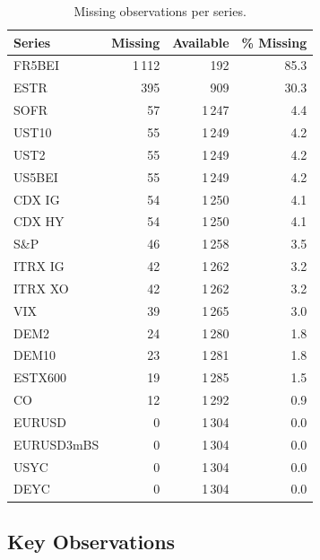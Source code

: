 \begin{table}[H]
  \centering
  \caption{Missing observations per series.}
  \label{tab:missing}
  \small
  \begin{tabular}{lrrr}
    \toprule
    \textbf{Series} & \textbf{Missing} & \textbf{Available} & \textbf{\% Missing} \\
    \midrule
    FR5BEI       & 1\,112 &   192 & 85.3 \\
    ESTR         &   395 &   909 & 30.3 \\
    SOFR         &    57 & 1\,247 &  4.4 \\
    UST10        &    55 & 1\,249 &  4.2 \\
    UST2         &    55 & 1\,249 &  4.2 \\
    US5BEI       &    55 & 1\,249 &  4.2 \\
    CDX IG       &    54 & 1\,250 &  4.1 \\
    CDX HY       &    54 & 1\,250 &  4.1 \\
    S\&P         &    46 & 1\,258 &  3.5 \\
    ITRX IG      &    42 & 1\,262 &  3.2 \\
    ITRX XO      &    42 & 1\,262 &  3.2 \\
    VIX          &    39 & 1\,265 &  3.0 \\
    DEM2         &    24 & 1\,280 &  1.8 \\
    DEM10        &    23 & 1\,281 &  1.8 \\
    ESTX600      &    19 & 1\,285 &  1.5 \\
    CO           &    12 & 1\,292 &  0.9 \\
    EURUSD       &     0 & 1\,304 &  0.0 \\
    EURUSD3mBS   &     0 & 1\,304 &  0.0 \\
    USYC         &     0 & 1\,304 &  0.0 \\
    DEYC         &     0 & 1\,304 &  0.0 \\
    \bottomrule
  \end{tabular}
\end{table}

\subsection*{Key Observations}

